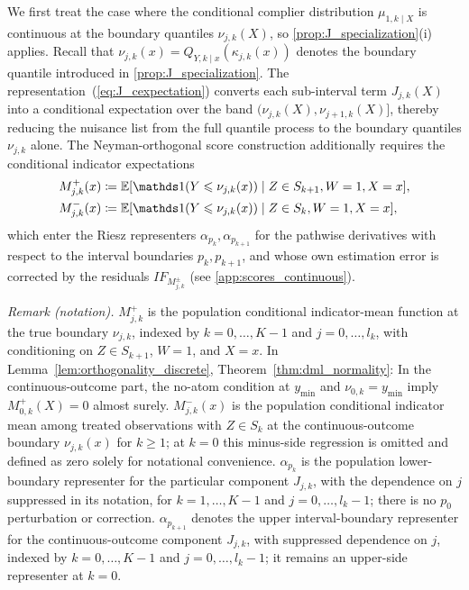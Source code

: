 We first treat the case where the conditional complier distribution $\mu_{1,k\mid X}$ is continuous at the boundary quantiles $\nu_{j,k}(X)$, so \cref{prop:J_specialization}(i) applies. Recall that $\nu_{j,k}(x)=Q_{Y,k\mid x}(\kappa_{j,k}(x))$ denotes the boundary quantile introduced in \cref{prop:J_specialization}. The representation~(\ref{eq:J_cexpectation}) converts each sub-interval term $J_{j,k}(X)$ into a conditional expectation over the band $(\nu_{j,k}(X), \nu_{j+1,k}(X)]$, thereby reducing the nuisance list from the full quantile process to the boundary quantiles $\nu_{j,k}$ alone. The Neyman-orthogonal score construction additionally requires the conditional indicator expectations
\begin{align*}
    M_{j,k}^{+}(x) &\coloneqq \mathbb{E}[\indicator(Y \leqslant \nu_{j,k}(x)) \mid Z \in S_{k+1}, W=1, X=x], \\
    M_{j,k}^{-}(x) &\coloneqq \mathbb{E}[\indicator(Y \leqslant \nu_{j,k}(x)) \mid Z \in S_k, W=1, X=x],
\end{align*}
which enter the Riesz representers $\alpha_{p_k}, \alpha_{p_{k+1}}$ for the pathwise derivatives with respect to the interval boundaries $p_k, p_{k+1}$, and whose own estimation error is corrected by the residuals $IF_{M^{\pm}_{j,k}}$ (see \cref{app:scores_continuous}).

\noindent\textit{Remark (notation).} $M_{j,k}^{+}$ is the population conditional indicator-mean function at the true boundary $\nu_{j,k}$, indexed by $k=0,\ldots,K-1$ and $j=0,\ldots,l_k$, with conditioning on $Z\in S_{k+1}$, $W=1$, and $X=x$. In Lemma~\ref{lem:orthogonality_discrete}, Theorem~\ref{thm:dml_normality}: In the continuous-outcome part, the no-atom condition at $y_{\min}$ and $\nu_{0,k}=y_{\min}$ imply $M_{0,k}^{+}(X)=0$ almost surely. $M_{j,k}^{-}(x)$ is the population conditional indicator mean among treated observations with $Z\in S_k$ at the continuous-outcome boundary $\nu_{j,k}(x)$ for $k\geqslant1$; at $k=0$ this minus-side regression is omitted and defined as zero solely for notational convenience. $\alpha_{p_k}$ is the population lower-boundary representer for the particular component $J_{j,k}$, with the dependence on $j$ suppressed in its notation, for $k=1,\ldots,K-1$ and $j=0,\ldots,l_k-1$; there is no $p_0$ perturbation or correction. $\alpha_{p_{k+1}}$ denotes the upper interval-boundary representer for the continuous-outcome component $J_{j,k}$, with suppressed dependence on $j$, indexed by $k=0,\ldots,K-1$ and $j=0,\ldots,l_k-1$; it remains an upper-side representer at $k=0$.


